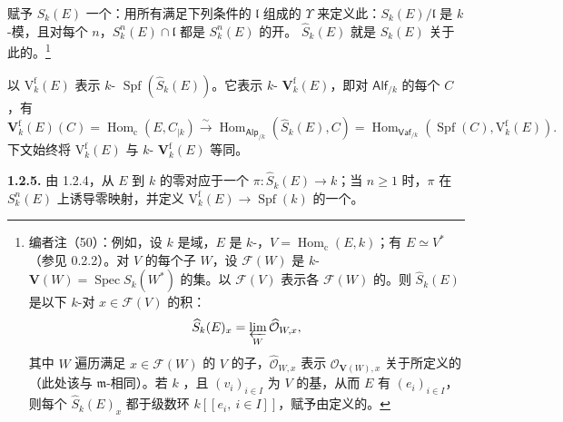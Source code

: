 赋予 $S_k(E)$ 一个：用所有满足下列条件的 $\mathfrak l$ 组成的 $\Upsilon$ 来定义此：$S_k(E)/\mathfrak l$ 是 $k$-模，且对每个 $n$，$S_k^n(E)\cap\mathfrak l$ 都是 $S_k^n(E)$ 的开。 $\widehat S_k(E)$ 就是 $S_k(E)$ 关于此的。\footnote{编者注（50）：例如，设 $k$ 是域，$E$ 是 $k$-，$V=\operatorname{Hom}_{\mathrm c}(E,k)$；有 $E\simeq V^*$（参见 0.2.2）。对 $V$ 的每个子 $W$，设 $\mathscr F(W)$ 是 $k$- $\mathbf V(W)=\operatorname{Spec}S_k(W^*)$ 的集。以 $\mathscr F(V)$ 表示各 $\mathscr F(W)$ 的。则 $\widehat S_k(E)$ 是以下 $k$-对 $x\in\mathscr F(V)$ 的积：
\[
 \widehat S_k(E)_x=\varprojlim_W\widehat{\mathcal O}_{W,x},
\]
其中 $W$ 遍历满足 $x\in\mathscr F(W)$ 的 $V$ 的子，$\widehat{\mathcal O}_{W,x}$ 表示 $\mathcal O_{\mathbf V(W),x}$ 关于所定义的（此处该与 $\mathfrak m$-相同）。若 $k$ ，且 $(v_i)_{i\in I}$ 为 $V$ 的基，从而 $E$ 有 $(e_i)_{i\in I}$，则每个 $\widehat S_k(E)_x$ 都于级数环 $k[[e_i,\ i\in I]]$，赋予由定义的。}

以 $\mathrm V_k^{\mathrm f}(E)$ 表示 $k$- $\operatorname{Spf}(\widehat S_k(E))$。它表示 $k$- $\mathbf V_k^{\mathrm f}(E)$，即对 $\mathsf{Alf}_{/k}$ 的每个 $C$，有
\[
 \mathbf V_k^{\mathrm f}(E)(C)=\operatorname{Hom}_{\mathrm c}(E,C_{|k})
 \xrightarrow{\sim}\operatorname{Hom}_{\mathsf{Alp}_{/k}}(\widehat S_k(E),C)
 =\operatorname{Hom}_{\mathsf{Vaf}_{/k}}(\operatorname{Spf}(C),\mathrm V_k^{\mathrm f}(E)).
\]
下文始终将 $\mathrm V_k^{\mathrm f}(E)$ 与 $k$- $\mathbf V_k^{\mathrm f}(E)$ 等同。

\textbf{1.2.5.} 由 1.2.4，从 $E$ 到 $k$ 的零对应于一个 $\pi:\widehat S_k(E)\to k$；当 $n\geq1$ 时，$\pi$ 在 $S_k^n(E)$ 上诱导零映射，并定义 $\mathrm V_k^{\mathrm f}(E)\to\operatorname{Spf}(k)$ 的一个。

